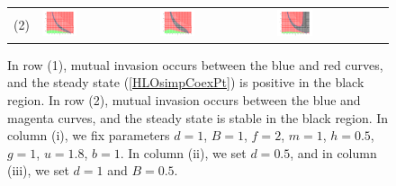 \documentclass[12pt]{UOthesis}
\theoremstyle{remarkstyle}
\begin{document}
\begin{figure}[h!]
\begin{tabular}{m{0.07cm} m{4.5cm}  m{4.5cm}  m{4.5cm}}
	(2) & \includegraphics[width=0.33\textwidth]{HLOSimpMutualInvasionOnEigenvalues1.png} & \includegraphics[width=0.33\textwidth]{HLOSimpMutualInvasionOnEigenvalues2.png} & \includegraphics[width=0.33\textwidth]{HLOSimpMutualInvasionOnEigenvalues3.png}
	\end{tabular}
	\caption[Mutual invasion and coexistence in the simplified lynx and owl model]{In row (1), mutual invasion occurs between the blue and red curves, and the steady state (\ref{HLOsimpCoexPt}) is positive in the black region. In row (2), mutual invasion occurs between the blue and magenta curves, and the steady state is stable in the black region. In column (i), we fix parameters $d=1$, $B=1$, $f=2$, $m=1$, $h=0.5$, $g=1$, $u=1.8$, $b=1$. In column (ii), we set $d=0.5$, and in column (iii), we set $d=1$ and $B=0.5$.\label{HLOSimpMutualInvasionOnSteadyStateAndEigenvalues}}%
\end{figure}
\end{document}
